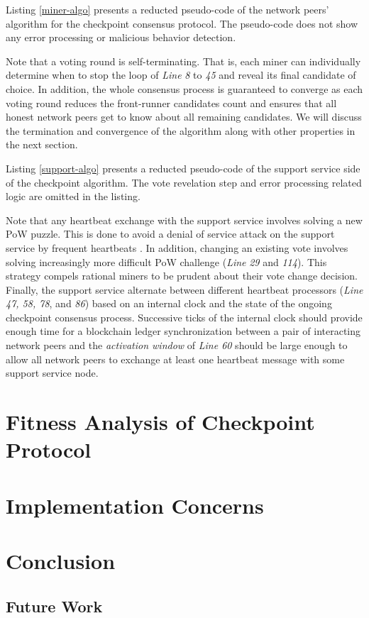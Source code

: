 \documentclass[conference]{IEEEtran}
\begin{document}
Listing \ref{miner-algo} presents a reducted pseudo-code of the network peers' algorithm for the checkpoint consensus protocol. The pseudo-code does not show any error processing or malicious behavior detection.

\lstset{caption=A miner's perspective of the checkpoint protocol, label=miner-algo}
 

Note that a voting round is self-terminating. That is, each miner can individually determine when to stop the loop of \textit{Line} \textit{8} to \textit{45} and reveal its final candidate of choice. In addition, the whole consensus process is guaranteed to converge as each voting round reduces the front-runner candidates count and ensures that all honest network peers get to know about all remaining candidates. We will discuss the termination and convergence of the algorithm along with other properties in the next section.

Listing \ref{support-algo} presents a reducted pseudo-code of the support service side of the checkpoint algorithm. The vote revelation step and error processing related logic are omitted in the listing.

\lstset{caption=Support service's perspective of the checkpoint protocol, label=support-algo}


Note that any heartbeat exchange with the support service involves solving a new PoW puzzle. This is done to avoid a denial of service attack on the support service by frequent heartbeats \cite{Back02hashcash}. In addition, changing an existing vote involves solving increasingly more difficult PoW challenge (\textit{Line} \textit{29} and \textit{114}). This strategy compels rational miners to be prudent about their vote change decision. Finally, the support service alternate between different heartbeat processors (\textit{Line 47, 58, 78}, and \textit{86}) based on an internal clock and the state of the ongoing checkpoint consensus process. Successive ticks of the internal clock should provide enough time for a blockchain ledger synchronization between a pair of interacting network peers and the \textit{activation window} of \textit{Line 60} should be large enough to allow all network peers to exchange at least one heartbeat message with some support service node.  
        
\section{Fitness Analysis of Checkpoint Protocol}
\label{s-analysis}


\section{Implementation Concerns}
\label{s-implementation}

\section{Conclusion}
\label{s-conclusion}
\subsection{Future Work}
 


\end{document}
